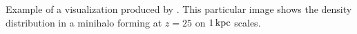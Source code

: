 \label{fig:vis}
Example of a visualization produced by .  This particular image shows the density distribution in a minihalo forming at $z=25$ on $1\,{\rm kpc}$ scales.
